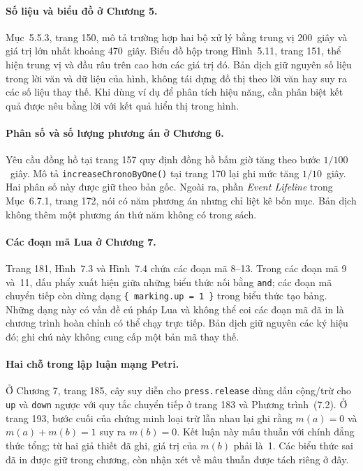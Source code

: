 \paragraph{Số liệu và biểu đồ ở Chương 5.}
Mục~5.5.3, trang 150, mô tả trường hợp hai bộ xử lý bằng trung vị 200~giây và giá trị lớn nhất khoảng 470~giây. Biểu đồ hộp trong Hình~5.11, trang 151, thể hiện trung vị và đầu râu trên cao hơn các giá trị đó. Bản dịch giữ nguyên số liệu trong lời văn và dữ liệu của hình, không tái dựng đồ thị theo lời văn hay suy ra các số liệu thay thế. Khi dùng ví dụ để phân tích hiệu năng, cần phân biệt kết quả được nêu bằng lời với kết quả hiển thị trong hình.

\paragraph{Phân số và số lượng phương án ở Chương 6.}
Yêu cầu đồng hồ tại trang 157 quy định đồng hồ bấm giờ tăng theo bước \(1/100\)~giây. Mô tả \texttt{increaseChronoByOne()} tại trang 170 lại ghi mức tăng \(1/10\)~giây. Hai phân số này được giữ theo bản gốc. Ngoài ra, phần \emph{Event Lifeline} trong Mục~6.7.1, trang 172, nói có năm phương án nhưng chỉ liệt kê bốn mục. Bản dịch không thêm một phương án thứ năm không có trong sách.

\newpage
\paragraph{Các đoạn mã Lua ở Chương 7.}
Trang 181, Hình~7.3 và Hình~7.4 chứa các đoạn mã 8--13. Trong các đoạn mã 9 và~11, dấu phẩy xuất hiện giữa những biểu thức nối bằng \texttt{and}; các đoạn mã chuyển tiếp còn dùng dạng \texttt{\{ marking.up = 1 \}} trong biểu thức tạo bảng. Những dạng này có vấn đề cú pháp Lua và không thể coi các đoạn mã đã in là chương trình hoàn chỉnh có thể chạy trực tiếp. Bản dịch giữ nguyên các ký hiệu đó; ghi chú này không cung cấp một bản mã thay thế.

\begin{samepage}
\paragraph{Hai chỗ trong lập luận mạng Petri.}
Ở Chương 7, trang 185, cây suy diễn cho \texttt{press.release} dùng dấu cộng/trừ cho \texttt{up} và \texttt{down} ngược với quy tắc chuyển tiếp ở trang 183 và Phương trình~(7.2). Ở trang 193, bước cuối của chứng minh loại trừ lẫn nhau lại ghi rằng \(m(a)=0\) và \(m(a)+m(b)=1\) suy ra \(m(b)=0\). Kết luận này mâu thuẫn với chính đẳng thức tổng; từ hai giả thiết đã ghi, giá trị của \(m(b)\) phải là~1. Các biểu thức sai đã in được giữ trong chương, còn nhận xét về mâu thuẫn được tách riêng ở đây.
\par\end{samepage}

